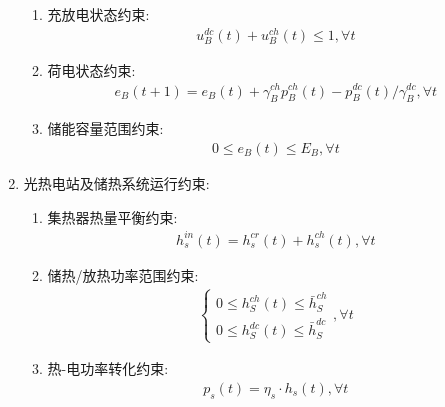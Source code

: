 \documentclass{article}
\begin{document}
\begin{enumerate}
{\begin{enumerate}
{\begin{align}
\begin{cases}
                        0\leq p_B^{dc}(t)\leq u_B^{dc}(t)\cdot C_B^{max}\\
                        0\leq p_B^{ch}(t)\leq u_B^{ch}(t)\cdot C_B^{max}\\
                        0\leq p_B^{dc}(t)\leq C_B\\
                        0\leq p_B^{ch}(t)\leq C_B
                    \end{cases},\forall t
                \end{align}
            }
            \item {充放电状态约束:
                \begin{align}
                    u_B^{dc}(t)+u_B^{ch}(t)\leq1,\forall t
                \end{align}
            }
            \item {荷电状态约束:
                \begin{align}
                    e_B(t+1){=}e_B(t){+}\gamma_B^{ch}p_B^{ch}(t){-}p_B^{dc}(t)/\gamma_B^{dc},\forall t
                \end{align}
            }
            \item {储能容量范围约束:
                \begin{align}
                    0\leq e_B(t)\leq E_B,\forall t
                \end{align}
            }
        \end{enumerate}
    }
    \item {光热电站及储热系统运行约束:
        \begin{enumerate}
            \item {集热器热量平衡约束:
                \begin{align}
                    h_{s}^{in}(t)=h_{s}^{cr}(t)+h_{s}^{ch}(t),\forall t
                \end{align}
            }
            \item {储热/放热功率范围约束:
                \begin{align}
                    \begin{cases}0\le h_S^{ch}(t)\le\bar{h}_S^{ch}\\0\le h_S^{dc}(t)\le\bar{h}_S^{dc}\end{cases},\forall t
                \end{align}
            }
            \item {热-电功率转化约束:
                \begin{align}
                    p_s(t)=\eta_s\cdot h_s(t),\forall t

\end{align}}
\end{enumerate}}
\end{enumerate}
\end{document}
